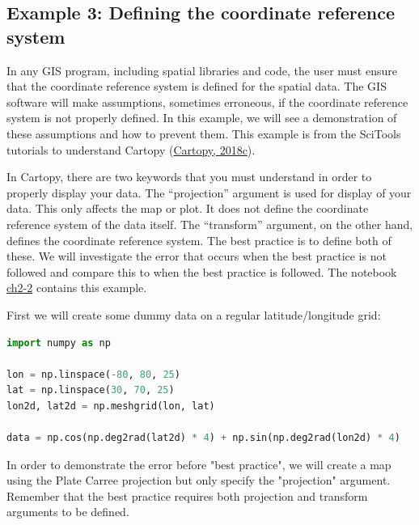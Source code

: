 \documentclass[a4paper , 12pt]{book}
\begin{document}
\subsection*{Example 3: Defining the coordinate reference system}

In any GIS program, including spatial libraries and code, the user must ensure that the coordinate reference system is defined for the spatial data. The GIS software will make assumptions, sometimes erroneous, if the coordinate reference system is not properly defined. In this example, we will see a demonstration of these assumptions and how to prevent them. This example is from the SciTools tutorials to understand Cartopy (\href{https://scitools.org.uk/cartopy/docs/latest/tutorials/understanding_transform.html}{Cartopy, 2018c}).

In Cartopy, there are two keywords that you must understand in order to properly display your data. The “projection” argument is used for display of your data. This only affects the map or plot. It does not define the coordinate reference system of the data itself. The “transform” argument, on the other hand, defines the coordinate reference system. The best practice is to define both of these. We will investigate the error that occurs when the best practice is not followed and compare this to when the best practice is followed. The notebook \href{https://github.com/nfcd/compGeo/blob/master/source/notebooks/ch2-2.ipynb}{ch2-2} contains this example.

First we will create some dummy data on a regular latitude/longitude grid:\\

\begin{center}
\begin{lstlisting}[language=Python, frame=single]
import numpy as np

lon = np.linspace(-80, 80, 25)
lat = np.linspace(30, 70, 25)
lon2d, lat2d = np.meshgrid(lon, lat)

data = np.cos(np.deg2rad(lat2d) * 4) + np.sin(np.deg2rad(lon2d) * 4)
\end{lstlisting}
\end{center}

In order to demonstrate the error before "best practice", we will create a map using the Plate Carree projection but only specify the "projection" argument. Remember that the best practice requires both projection and transform arguments to be defined.
\end{document}
